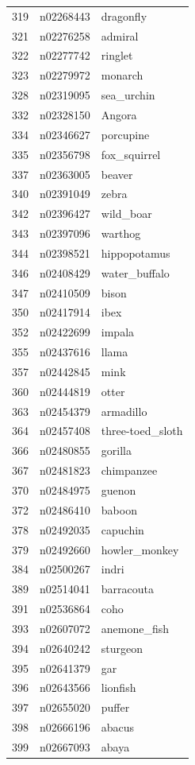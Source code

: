 \begin{table}
\begin{tabular}{cll}
319 & n02268443 & dragonfly \\
321 & n02276258 & admiral \\
322 & n02277742 & ringlet \\
323 & n02279972 & monarch \\
328 & n02319095 & sea_urchin \\
332 & n02328150 & Angora \\
334 & n02346627 & porcupine \\
335 & n02356798 & fox_squirrel \\
337 & n02363005 & beaver \\
340 & n02391049 & zebra \\
342 & n02396427 & wild_boar \\
343 & n02397096 & warthog \\
344 & n02398521 & hippopotamus \\
346 & n02408429 & water_buffalo \\
347 & n02410509 & bison \\
350 & n02417914 & ibex \\
352 & n02422699 & impala \\
355 & n02437616 & llama \\
357 & n02442845 & mink \\
360 & n02444819 & otter \\
363 & n02454379 & armadillo \\
364 & n02457408 & three-toed_sloth \\
366 & n02480855 & gorilla \\
367 & n02481823 & chimpanzee \\
370 & n02484975 & guenon \\
372 & n02486410 & baboon \\
378 & n02492035 & capuchin \\
379 & n02492660 & howler_monkey \\
384 & n02500267 & indri \\
389 & n02514041 & barracouta \\
391 & n02536864 & coho \\
393 & n02607072 & anemone_fish \\
394 & n02640242 & sturgeon \\
395 & n02641379 & gar \\
396 & n02643566 & lionfish \\
397 & n02655020 & puffer \\
398 & n02666196 & abacus \\
399 & n02667093 & abaya \\

\end{tabular}
\end{table}
